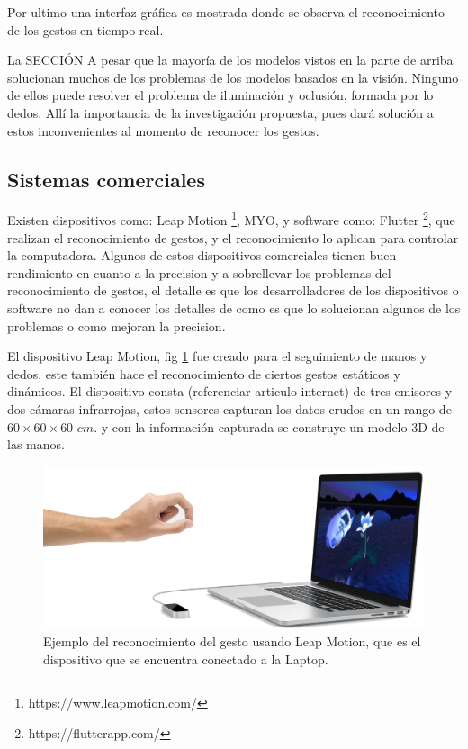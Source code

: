 Por ultimo una interfaz gráfica es mostrada donde se observa el reconocimiento de los gestos en tiempo real.  


La SECCIÓN A pesar que la mayoría de los modelos vistos en la parte de arriba solucionan muchos de los problemas de los modelos basados en la visi\'on. Ninguno de ellos puede resolver el problema de iluminaci\'on y oclusi\'on, formada por lo dedos. All\'i la importancia de la investigaci\'on propuesta, pues dar\'a soluci\'on a estos inconvenientes al momento de reconocer los gestos.
 
\subsection{Sistemas comerciales}

Existen dispositivos como: Leap Motion \footnote{https://www.leapmotion.com/}, MYO, y software como: Flutter \footnote{https://flutterapp.com/}, que realizan el reconocimiento de gestos, y el reconocimiento lo aplican  para controlar la computadora. Algunos de estos dispositivos comerciales tienen  buen rendimiento en cuanto a la precision y a sobrellevar los problemas del reconocimiento de gestos, el detalle es que los desarrolladores de los dispositivos o software no dan a conocer los detalles de como es que lo solucionan algunos de los problemas o como mejoran la precision.
 
El dispositivo Leap Motion, fig \ref{fig:LeapMotion} fue creado para el seguimiento de manos y dedos, este también hace el reconocimiento de ciertos gestos estáticos y dinámicos. El dispositivo consta (referenciar articulo internet) de tres emisores y dos cámaras infrarrojas, estos sensores capturan los datos crudos en un rango de $60 \times 60 \times 60$ $cm.$ y con la información capturada se construye un modelo 3D de las manos. 

\begin{figure}[h!]
\begin{center}
\includegraphics[scale=.3]{./Figures/LeapMotion.png}
\end{center}
\caption{Ejemplo del reconocimiento del gesto usando Leap Motion, que es el dispositivo que se encuentra conectado a la Laptop.}
\label{fig:LeapMotion}
\end{figure}

